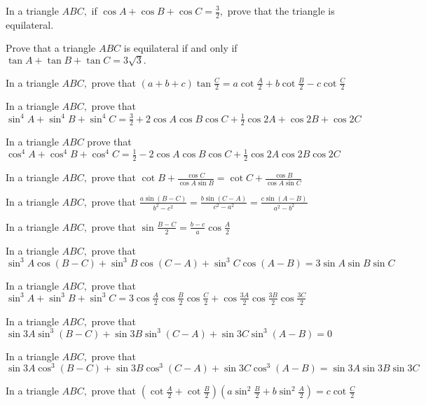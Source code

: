 \item In a triangle $ABC,$ if $\cos A + \cos B + \cos C = \frac{3}{2},$ prove that the triangle is equilateral.

\item Prove that a triangle $ABC$ is equilateral if and only if $\tan A + \tan B + \tan C = 3\sqrt{3}.$

\item In a triangle $ABC,$ prove that $(a + b + c)\tan\frac{C}{2} = a\cot\frac{A}{2} + b\cot\frac{B}{2} -
     c\cot\frac{C}{2}$

\item In a triangle $ABC,$ prove that $\sin^4A + \sin^4B + \sin^4C = \frac{3}{2} + 2\cos A\cos B\cos C + \frac{1}{2}\cos
     2A + \cos 2B + \cos 2C$

\item In a triangle $ABC$ prove that $\cos^4A + \cos^4B + \cos^4C = \frac{1}{2} - 2\cos A\cos B\cos C + \frac{1}{2}\cos
     2A\cos 2B\cos 2C$

\item In a triangle $ABC,$ prove that $\cot B + \frac{\cos C}{\cos A\sin B} = \cot C + \frac{\cos B}{\cos A\sin C}$

\item In a triangle $ABC,$ prove that $\frac{a\sin(B - C)}{b^2 - c^2} = \frac{b\sin(C - A)}{c^2 - a^2} = \frac{c\sin(A -
     B)}{a^2 - b^2}$

\item In a triangle $ABC,$ prove that $\sin\frac{B - C}{2} = \frac{b - c}{a}\cos \frac{A}{2}$

\item In a triangle $ABC,$ prove that $\sin^3A\cos(B - C) + \sin^3B\cos(C - A) + \sin^3C\cos(A - B) = 3\sin A\sin B\sin
     C$

\item In a triangle $ABC,$ prove that $\sin^3A + \sin^3B + \sin^3C = 3\cos\frac{A}{2}\cos\frac{B}{2}\cos\frac{C}{2} +
     \cos\frac{3A}{2}\cos\frac{3B}{2}\cos\frac{3C}{2}$

\item In a triangle $ABC,$ prove that $\sin3A\sin^3(B - C) + \sin3B\sin^3(C - A) + \sin3C\sin^3(A - B) = 0$

\item In a triangle $ABC,$ prove that $\sin3A\cos^3(B - C) + \sin3B\cos^3(C - A) + \sin3C\cos^3(A - B) = \sin 3A\sin
     3B\sin 3C$

\item In a triangle $ABC,$ prove that $\left(\cot\frac{A}{2} + \cot\frac{B}{2}\right)\left(a\sin^2\frac{B}{2} +
     b\sin^2\frac{A}{2}\right) = c\cot\frac{C}{2}$

